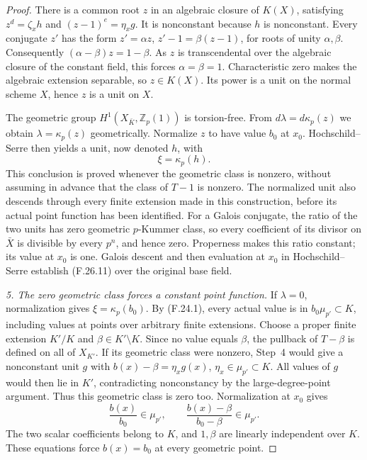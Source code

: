 \documentclass[11pt]{article}
\begin{document}
\begin{proof}
There is a common root \(z\) in an algebraic closure
of \(K(X)\), satisfying
\(z^d=\zeta_xh\) and \((z-1)^e=\eta_xg\).
It is nonconstant because \(h\) is nonconstant.
Every conjugate \(z'\) has the form
\(z'=\alpha z\), \(z'-1=\beta(z-1)\), for
roots of unity \(\alpha,\beta\). Consequently
\((\alpha-\beta)z=1-\beta\). As \(z\) is
transcendental over the algebraic closure of the
constant field, this forces \(\alpha=\beta=1\).
Characteristic zero makes the algebraic extension
separable, so \(z\in K(X)\). Its power is a unit
on the normal scheme \(X\), hence \(z\) is a
unit on \(X\).

The geometric group \(H^1(X_{\bar K},\mathbb Z_p(1))\)
is torsion-free. From \(d\lambda=d\kappa_p(z)\)
we obtain \(\lambda=\kappa_p(z)\) geometrically.
Normalize \(z\) to have value \(b_0\) at \(x_0\).
Hochschild--Serre then yields a unit, now denoted \(h\),
with
\[
                             \xi=\kappa_p(h).            \tag{F.26.11}
\]
This conclusion is proved whenever the geometric class
is nonzero, without assuming in advance that the
class of \(T-1\) is nonzero. The normalized unit
also descends through every finite extension made in
this construction, before its actual point function
has been identified. For a Galois conjugate, the ratio
of the two units has zero geometric \(p\)-Kummer class,
so every coefficient of its divisor on \(\bar X\)
is divisible by every \(p^n\), and hence zero.
Properness makes this ratio constant; its value at
\(x_0\) is one. Galois descent and then evaluation
at \(x_0\) in Hochschild--Serre establish
(F.26.11) over the original base field.

\emph{5. The zero geometric class forces a constant point function.}
If \(\lambda=0\), normalization gives
\(\xi=\kappa_p(b_0)\). By (F.24.1), every
actual value is in \(b_0\mu_{p'}\subset K\),
including values at points over arbitrary finite
extensions. Choose a proper finite extension
\(K'/K\) and \(\beta\in K'\setminus K\).
Since no value equals \(\beta\), the pullback of
\(T-\beta\) is defined on all of \(X_{K'}\).
If its geometric class were nonzero, Step~4 would
give a nonconstant unit \(g\) with
\(b(x)-\beta=\eta_xg(x)\),
\(\eta_x\in\mu_{p'}\subset K\). All values of
\(g\) would then lie in \(K'\), contradicting
nonconstancy by the large-degree-point argument.
Thus this geometric class is zero too. Normalization
at \(x_0\) gives
\[
              \frac{b(x)}{b_0}\in\mu_{p'},\qquad
              \frac{b(x)-\beta}{b_0-\beta}\in\mu_{p'}.
\]
The two scalar coefficients belong to \(K\),
and \(1,\beta\) are linearly independent over
\(K\). These equations force \(b(x)=b_0\) at
every geometric point.


\end{proof}
\end{document}
